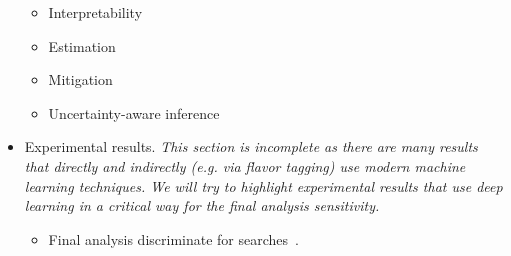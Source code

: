 \documentclass[12pt,letterpaper]{article}
\begin{document}
\begin{itemize}
	\begin{itemize}
		\item Interpretability~\cite{deOliveira:2015xxd,Chang:2017kvc,Diefenbacher:2019ezd}
		\item Estimation~\cite{Nachman:2019dol,Nachman:2019yfl,Barnard:2016qma}
		\item Mitigation~\cite{Estrade:DLPS2017,Englert:2018cfo,Louppe:2016ylz}
		\item Uncertainty-aware inference~\cite{Caron:2019xkx,Bollweg:2019skg,deCastro:2018mgh,Wunsch:2020iuh}
	\end{itemize}
\item Experimental results. \textit{This section is incomplete as there are many results that directly and indirectly (e.g. via flavor tagging) use modern machine learning techniques.  We will try to highlight experimental results that use deep learning in a critical way for the final analysis sensitivity.}
	\begin{itemize}
		\item Final analysis discriminate for searches~\cite{Aad:2019yxi,Aad:2020hzm,collaboration2020dijet,Sirunyan:2020hwz}.
	\end{itemize}


\end{itemize}


\clearpage
\flushbottom
%


\end{document}

